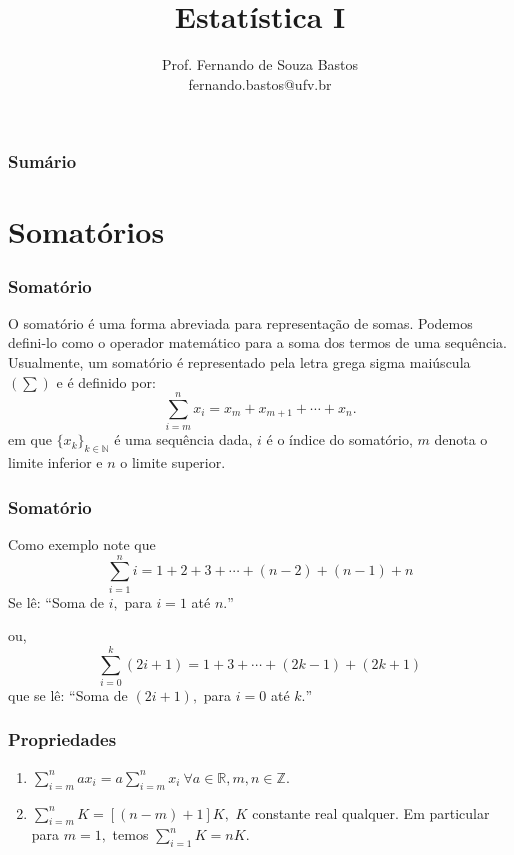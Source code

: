 \documentclass[12pt]{beamer}
\title{Estatística I}
\author{Prof. Fernando de Souza Bastos \texorpdfstring{\\ fernando.bastos@ufv.br}{}}
\institute{Departamento de Estatística \texorpdfstring{\\ Universidade Federal de Viçosa}{}\texorpdfstring{\\ Campus UFV - Viçosa}{}}
\date{}
\newcounter{saveenumi}
\newcommand{\seti}{\setcounter{saveenumi}{\value{enumi}}}
\begin{document}

\frame{\titlepage}

\begin{frame}{}
\frametitle{\bf Sumário}
\tableofcontents
\end{frame}

\section{Somatórios}
\begin{frame}{}
\frametitle{Somatório}
\begin{block}{}
\justifying
O somatório é uma forma abreviada para representação de somas. Podemos defini-lo como o operador matemático para a soma dos termos de uma sequência. Usualmente, um somatório é representado pela letra grega sigma maiúscula $(\sum)$ e é definido por:
\begin{equation}
{\displaystyle \sum_{i=m}^{n}x_{i}=x_{m}+x_{m+1}+\cdots+x_{n}.}
\end{equation}
em que $\{ x_{k} \}_{k\in \mathds{N}}$ é uma sequência dada, $i$ é o índice do somatório, $m$ denota o limite inferior e $n$ o limite superior.
\end{block}
\end{frame}

\begin{frame}{}
\frametitle{Somatório}
\begin{block}{}
\justifying
Como exemplo note que
\begin{equation}
{\displaystyle \sum_{i=1}^{n}i=1+2+3+\cdots+(n-2)+(n-1)+n}
\end{equation}
Se lê: ``Soma de $i,$ para $i=1$ até $n.$''
\end{block}
\pause
\begin{block}{}
\justifying
ou,
\begin{equation}
{\displaystyle \sum_{i=0}^{k}(2i+1)=1+3+\cdots+(2k-1)+(2k+1)}
\end{equation}
que se lê: ``Soma de $(2i+1),$ para $i=0$ até $k.$''
\end{block}
\end{frame}

\begin{frame}{}
\frametitle{Propriedades}
\begin{block}{}
\justifying
\begin{enumerate}
\item ${\displaystyle \sum_{i=m}^{n}ax_{i}=a\sum_{i=m}^{n}x_{i}\ \forall a\in \mathds{R}, m,n\in \mathds{Z}.}$
\item ${\displaystyle \sum_{i=m}^{n}K=[(n-m)+1]K},$ $K$ constante real qualquer. Em particular para $m=1,$ temos 
${\displaystyle \sum_{i=1}^{n}K=nK}.$
    \seti
\end{enumerate}
\end{block}
\end{frame}
\end{document}
